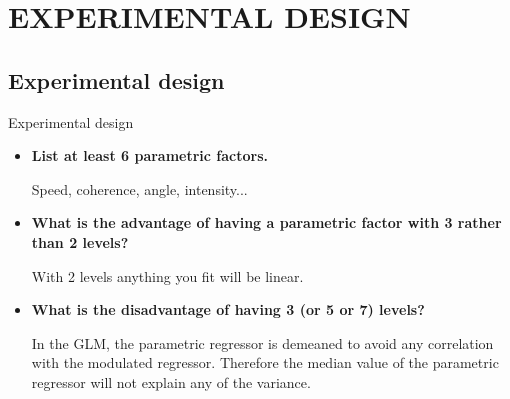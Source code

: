 \documentclass{beamer}
\begin{document}


\section{EXPERIMENTAL DESIGN}


\subsection[Experimental design]{Experimental design}


\begin{frame}{Experimental design}
  \begin{itemize}  
  \item \textbf{List at least 6 parametric factors.}

\smallskip 
Speed, coherence, angle, intensity...

\bigskip
  \item \textbf{What is the advantage of having a parametric factor with 3 rather than 2 levels?}

\smallskip 
With 2 levels anything you fit will be linear.

\bigskip
  \item \textbf{What is the disadvantage of having 3 (or 5 or 7) levels?}

\smallskip
In the GLM, the parametric regressor is demeaned to avoid any correlation with the modulated regressor. Therefore the median value of the parametric regressor will not explain any of the variance.
  \end{itemize}
\end{frame}

% 

\end{document}
